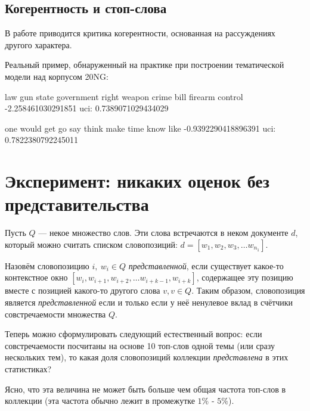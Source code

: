 

\subsection{Когерентность и стоп-слова}

В работе \cite{fan2019assessing} приводится критика когерентности, основанная на рассуждениях другого характера.


Реальный пример, обнаруженный на практике при построении тематической модели над корпусом 20NG:

law gun state government right weapon crime bill firearm control
-2.258461030291851
uci: 0.7389071029434029

one would get go say think make time know like
-0.9392290418896391
uci: 0.7822380792245011



\section{Эксперимент: никаких оценок без представительства}

Пусть $Q$ --- некое множество слов. Эти слова встречаются в неком документе $d$, который можно считать списком словопозиций: $d = [w_1, w_2, w_3, \dots w_{n_1}]$.

Назовём словопозицию $i, ~w_i \in Q$ \textit{представленной}, если существует какое-то контекстное окно $[w_i, w_{i+1}, w_{i+2}, \dots w_{i+k-1}, w_{i+k}]$, содержащее эту позицию вместе с позицией какого-то другого слова $v, v \in Q$. Таким образом, словопозиция является \textit{представленной} если и только если у неё ненулевое вклад в счётчики совстречаемости множества $Q$.

Теперь можно сформулировать следующий естественный вопрос: если совстречаемости посчитаны на основе 10 топ-слов одной темы (или сразу нескольких тем), то какая доля словопозиций коллекции \textit{представлена} в этих статистиках?

Ясно, что эта величина не может быть больше чем общая частота топ-слов в коллекции (эта частота обычно лежит в промежутке $1\%$ - $5\%$).

